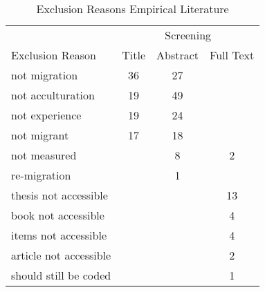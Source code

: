 \begin{wraptable}{l}{0pt}

\caption{\label{tab:EmpiricalExclusion}Exclusion Reasons Empirical Literature}
\centering
\begin{tabular}[t]{lccc}
\toprule
\multicolumn{1}{c}{ } & \multicolumn{3}{c}{Screening} \\
\cmidrule(l{3pt}r{3pt}){2-4}
Exclusion Reason & Title & Abstract & Full Text\\
\midrule
not migration & 36 & 27 & \\
not acculturation & 19 & 49 & \\
not experience & 19 & 24 & \\
not migrant & 17 & 18 & \\
not measured &  & 8 & 2\\
re-migration &  & 1 & \\
thesis not accessible &  &  & 13\\
book not accessible &  &  & 4\\
items not accessible &  &  & 4\\
article not accessible &  &  & 2\\
should still be coded &  &  & 1\\
\bottomrule
\end{tabular}
\end{wraptable}
